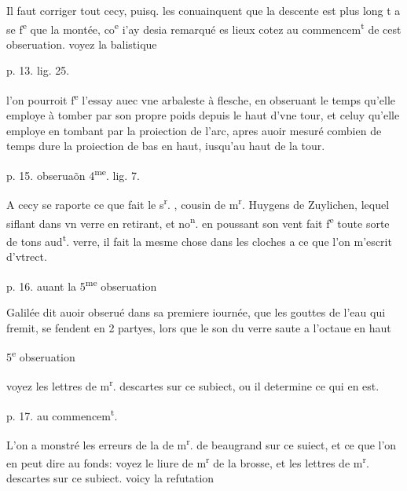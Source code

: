\documentclass[11pt,a4paper]{article}
\begin{document}
Il faut corriger tout cecy, puisq. les  conuainquent que la descente est plus long t\ill{} a se f\textsuperscript{e} que la montée, co\textsuperscript{e} i'ay desia remarqué es lieux cotez au commencem\textsuperscript{t} de cest obseruation. voyez la balistique



p. 13. lig. 25.

l'on pourroit f\textsuperscript{e} l'essay auec vne arbaleste à flesche, en obseruant le temps qu'elle employe à tomber par son propre poids depuis le haut d'vne tour, et celuy qu'elle employe en tombant par la proiection de l'arc, apres auoir mesuré combien de temps dure la proiection de bas en haut, iusqu'au haut de la tour.

p. 15. obseruaõn 4\textsuperscript{me}. lig. 7.

A cecy se raporte ce que fait le s\textsuperscript{r}. , cousin de m\textsuperscript{r}. Huygens de Zuylichen, lequel siflant dans vn verre en retirant, et no\textsuperscript{n}. en poussant son vent fait f\textsuperscript{e} toute sorte de tons aud\textsuperscript{t}. verre, il fait la mesme chose dans les cloches a ce que l'on m'escrit d'vtrect.

p. 16. auant la 5\textsuperscript{me} obseruation

Galilée dit auoir obserué dans sa premiere iournée, que les gouttes de l'eau qui fremit, se fendent en 2 partyes, lors que le son du verre saute a l'octaue en haut

5\textsuperscript{e} obseruation

voyez les lettres de m\textsuperscript{r}. descartes sur ce subiect, ou il determine ce qui en est.

p. 17. au commencem\textsuperscript{t}.

L'on a monstré les erreurs de la  de m\textsuperscript{r}. de beaugrand sur ce suiect, et ce que l'on en peut dire au fonds: voyez le liure de m\textsuperscript{r} de la brosse, et les lettres de m\textsuperscript{r}. descartes sur ce subiect. voicy la refutation
\end{document}
